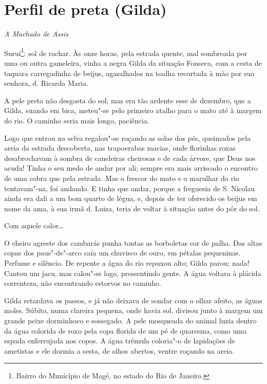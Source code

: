 \chapter{Perfil de preta (Gilda)}

\hfill{}\emph{A Machado de Assis}

\bigskip

Suruí\footnote{Bairro do Município de Magé, no estado do Rio de Janeiro.}:
sol de rachar. Às onze horas, pela estrada quente, mal sombreada por uma
ou outra gameleira, vinha a negra Gilda da situação Fonseca, com a cesta
de taquara carregadinha de beijus, agasalhados na toalha recortada à mão
por sua senhora, d. Ricarda Maria.

A pele preta não desgosta do sol; mas era tão ardente esse de dezembro,
que a Gilda, suando em bica, meteu"-se pelo primeiro atalho para o mato
até à margem do rio. O caminho seria mais longo, paciência.

Logo que entrou na selva regalou"-se roçando as solas dos pés, queimados
pela areia da estrada descoberta, nas trapoerabas macias, onde florinhas
roxas desabrochavam à sombra de caneleiras cheirosas e de cada árvore,
que Deus nos acuda! Tinha o seu medo de andar por ali; sempre era mais
arriscado o encontro de uma cobra que pela estrada. Mas o frescor do
mato e o marulhar do rio tentavam"-na, foi andando. E tinha que andar,
porque a freguesia de S. Nicolau ainda era dali a um bom quarto de
légua, e, depois de ter oferecido os beijus em nome da ama, à sua irmã
d. Luiza, teria de voltar à situação antes do pôr do sol.

Com aquele calor\ldots{}

O cheiro agreste dos cambarás punha tontas as borboletas cor de palha.
Das altas copas dos paus"-de"-arco caía um chuvisco de ouro, em pétalas
pequeninas. Perfume e silêncio. De repente a água do rio repuxou alto;
Gilda parou; nada! Cantou um jacu, mas calou"-se logo, pressentindo
gente. A água voltara à plácida correnteza, não encontrando estorvos no
caminho.

Gilda retardava os passos, e já não deixava de sondar com o olhar
afeito, as águas moles. Súbito, numa clareira pequena, onde havia sol,
divisou junto à margem um grande peixe dorminhoco e sossegado. A pele
mosqueada do animal luzia dentro da água colorida de roxo pela copa
florida de um pé de quaresma, como uma espada enferrujada nos copos. A
água trêmula coloria"-o de lapidações de ametistas e ele dormia a sesta,
de olhos abertos, ventre roçando na areia.

